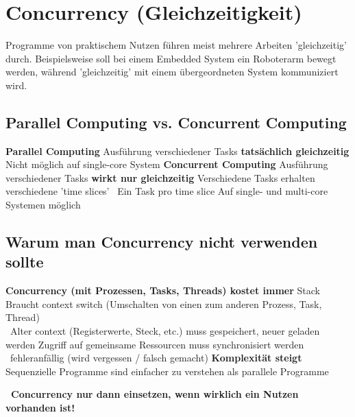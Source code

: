 \section{Concurrency (Gleichzeitigkeit)}

Programme von praktischem Nutzen führen meist mehrere Arbeiten 'gleichzeitig' durch. Beispielsweise soll bei einem Embedded System ein Roboterarm 
bewegt werden, während 'gleichzeitig' mit einem übergeordneten System kommuniziert wird.


\subsection{Parallel Computing vs. Concurrent Computing}


\begin{outline}
    \1 \textbf{Parallel Computing}
        \2 Ausführung verschiedener Tasks \textbf{tatsächlich gleichzeitig}
        \2 Nicht möglich auf single-core System
    \1 \textbf{Concurrent Computing}
        \2 Ausführung verschiedener Tasks \textbf{wirkt nur gleichzeitig}
        \2 Verschiedene Tasks erhalten verschiedene 'time slices' \textrightarrow\ Ein Task pro time slice
        \2 Auf single- und multi-core Systemen möglich
\end{outline}


\subsection{Warum man Concurrency nicht verwenden sollte}

\begin{outline}
    \1 \textbf{Concurrency (mit Prozessen, Tasks, Threads) kostet immer}
        \2 Stack
        \2 Braucht context switch (Umschalten von einen zum anderen Prozess, Task, Thread) \\
            \textrightarrow\ Alter context (Registerwerte, Steck, etc.) muss gespeichert, neuer geladen werden 
        \2 Zugriff auf gemeinsame Ressourcen muss synchronisiert werden \\
            \textrightarrow\ fehleranfällig (wird vergessen / falsch gemacht)
    \1 \textbf{Komplexität steigt}
        \2 Sequenzielle Programme sind einfacher zu verstehen als parallele Programme
\end{outline}

\vspace{0.1cm}

\textbf{ \textrightarrow\ Concurrency nur dann einsetzen, wenn wirklich ein Nutzen vorhanden ist!}


